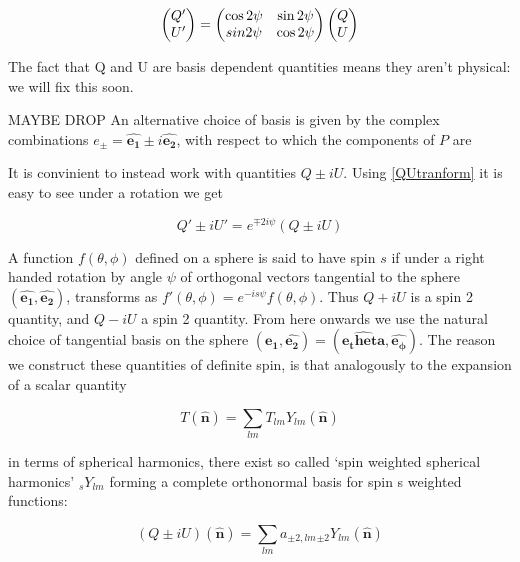 \documentclass[a4paper,11pt]{article}
\renewcommand{\v}[1]{\mathbf{#1}}
\newcommand{\unit}[1]{\hat{\v{#1}}}
\begin{document}
\begin{equation}
\begin{pmatrix}
Q'\\
U' 
\end{pmatrix}
=
\begin{pmatrix}
\cos{2\psi} & \sin{2\psi}\\ 
\-sin{2\psi} & \cos{2\psi}
\end{pmatrix}
\begin{pmatrix}
Q\\
U
\end{pmatrix}
\label{QUtranform}
\end{equation}

The fact that Q and U are basis dependent quantities means they aren't physical: we will fix this soon.

MAYBE DROP
An alternative choice of basis is given by the complex combinations $e_\pm = \unit{e_1} \pm i\unit{e_2}$, with respect to which the components of $P$ are 



It is convinient to instead work with quantities $Q\pm iU$. Using \ref{QUtranform} it is easy to see under a rotation we get  

\begin{equation}
Q'\pm iU' = e^{\mp 2i\psi}(Q\pm iU)
\end{equation}

A function $f(\theta, \phi)$ defined on a sphere is said to have spin $s$ if under a right handed rotation by angle $\psi$ of orthogonal vectors tangential to the sphere $(\unit{e_1}, \unit{e_2})$, transforms as $f'(\theta, \phi) = e^{-is\psi}f(\theta, \phi)$. Thus $Q+iU$ is a spin 2 quantity, and $Q-iU$ a spin 2 quantity. From here onwards we use the natural choice of tangential basis on the sphere $(\unit{e_1}, \unit{e_2}) = (\unit{e_theta}, \unit{e_\phi})$. The reason we construct these quantities of definite spin, is that analogously to the expansion of a scalar quantity

\begin{equation}
T(\unit{n}) = \sum_{lm} T_{lm}Y_{lm}(\unit{n})
\end{equation}

in terms of spherical harmonics, there exist so called `spin weighted spherical harmonics' $_sY_{lm}$ forming a complete orthonormal basis for spin s weighted functions:

\begin{equation}
(Q\pm iU)(\unit{n}) = \sum_{lm} a_{\pm2,lm} {}_{\pm2}Y_{lm}(\unit{n})
\label{QUexp}
\end{equation}
\end{document}
